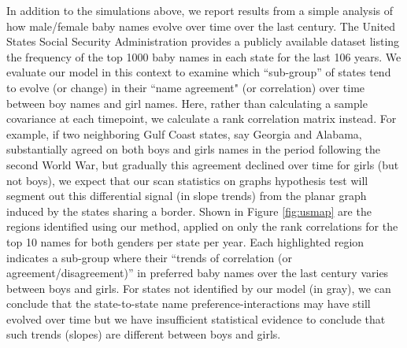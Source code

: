 In addition to the simulations above, we report results from a simple analysis of 
how male/female baby names evolve over time over the last century. 
The United States Social Security Administration provides a publicly available dataset listing the frequency of the 
top 1000 baby names in each state for the last 106 years.
We evaluate our model in this context to examine which ``sub-group'' of states tend to evolve (or change) in their
``name agreement" (or correlation) over time between boy names and girl names.
Here, rather than calculating a sample covariance
at each timepoint, we calculate a rank correlation matrix instead. 
For example, if two neighboring Gulf Coast states, say Georgia and Alabama, substantially 
agreed on both boys and girls names in the period following the second World War, but gradually this agreement 
declined over time for girls (but not boys), 
we expect that our scan statistics on graphs hypothesis test 
will segment out this differential signal (in slope trends) from the planar graph induced by the states sharing 
a border.
Shown in Figure \ref{fig:usmap} are the regions identified using our method, applied on only the rank correlations for the top 10 names for both genders per state per year. Each highlighted region indicates a sub-group
where their ``trends of correlation (or agreement/disagreement)'' in preferred baby names over the last century 
varies between boys and girls. 
For states not identified by our model (in gray), we can conclude that
the state-to-state name preference-interactions may have still 
evolved over time but we have insufficient statistical 
evidence to conclude that such trends (slopes) are different between boys and girls. 

